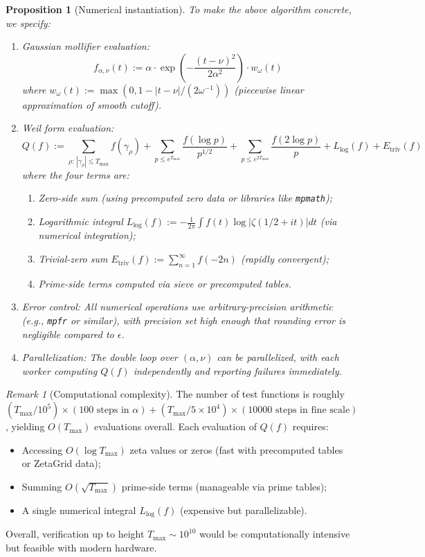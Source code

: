\documentclass[11pt]{article}
\theoremstyle{plain}
\newtheorem{proposition}[theorem]{Proposition}
\theoremstyle{definition}
\theoremstyle{remark}
\newtheorem{remark}[theorem]{Remark}
\begin{document}
\begin{proposition}[Numerical instantiation]
To make the above algorithm concrete, we specify:

\begin{enumerate}
  \item \emph{Gaussian mollifier evaluation:}
  \[
  f_{\alpha,\nu}(t) := \alpha \cdot \exp\left(-\frac{(t-\nu)^2}{2\alpha^2}\right) \cdot w_{\omega}(t)
  \]
  where $w_\omega(t) := \max(0, 1 - |t-\nu|/(2\omega^{-1}))$ (piecewise linear approximation of smooth cutoff).

  \item \emph{Weil form evaluation:}
  \[
  Q(f) := \sum_{\rho:\,|\gamma_\rho|\le T_{\max}} f(\gamma_\rho)
          + \sum_{p\le e^{T_{\max}}} \frac{f(\log p)}{p^{1/2}} + \sum_{p\le e^{2T_{\max}}} \frac{f(2\log p)}{p}
          + L_{\log}(f) + E_{\text{triv}}(f)
  \]
  where the four terms are:
  \begin{enumerate}
    \item Zero-side sum (using precomputed zero data or libraries like \texttt{mpmath});
    \item Logarithmic integral $L_{\log}(f) := -\frac{1}{2\pi}\int f(t)\log|\zeta(1/2+it)| dt$ (via numerical integration);
    \item Trivial-zero sum $E_{\text{triv}}(f) := \sum_{n=1}^{\infty} f(-2n)$ (rapidly convergent);
    \item Prime-side terms computed via sieve or precomputed tables.
  \end{enumerate}

  \item \emph{Error control:} All numerical operations use arbitrary-precision arithmetic (e.g., \texttt{mpfr} or similar),
  with precision set high enough that rounding error is negligible compared to $\epsilon$.

  \item \emph{Parallelization:} The double loop over $(\alpha, \nu)$ can be parallelized,
  with each worker computing $Q(f)$ independently and reporting failures immediately.
\end{enumerate}
\end{proposition}

\begin{remark}[Computational complexity]
The number of test functions is roughly $(T_{\max}/10^5) \times (100 \text{ steps in } \alpha) + (T_{\max}/5 \times 10^4) \times (10000 \text{ steps in fine scale})$,
yielding $O(T_{\max})$ evaluations overall.
Each evaluation of $Q(f)$ requires:
\begin{itemize}
  \item Accessing $O(\log T_{\max})$ zeta values or zeros (fast with precomputed tables or ZetaGrid data);
  \item Summing $O(\sqrt{T_{\max}})$ prime-side terms (manageable via prime tables);
  \item A single numerical integral $L_{\log}(f)$ (expensive but parallelizable).
\end{itemize}
Overall, verification up to height $T_{\max}\sim 10^{10}$ would be computationally intensive but feasible with modern hardware.
\end{remark}
\end{document}
